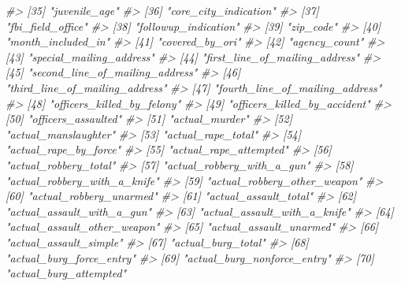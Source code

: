 \documentclass[
]{krantz}
\makeatletter
\newenvironment{Shaded}{\begin{snugshade}}{\end{snugshade}}
\newcommand{\CommentTok}[1]{\textcolor[rgb]{0.37,0.37,0.37}{\textit{#1}}}
\newenvironment{kframe}{%
\medskip{}
\setlength{\fboxsep}{.8em}
 \def\at@end@of@kframe{}%
 \ifinner\ifhmode%
  \def\at@end@of@kframe{\end{minipage}}%
  \begin{minipage}{\columnwidth}%
 \fi\fi%
 \def\FrameCommand##1{\hskip\@totalleftmargin \hskip-\fboxsep
 \colorbox{shadecolor}{##1}\hskip-\fboxsep
     \hskip-\linewidth \hskip-\@totalleftmargin \hskip\columnwidth}%
 \MakeFramed {\advance\hsize-\width
   \@totalleftmargin\z@ \linewidth\hsize
   \@setminipage}}%
 {\par\unskip\endMakeFramed%
 \at@end@of@kframe}
\renewenvironment{Shaded}{\begin{kframe}}{\end{kframe}}
\makeatother
\begin{document}
\begin{Shaded}
\begin{Highlighting}[]
\CommentTok{\#\textgreater{}  [35] "juvenile\_age"                    }
\CommentTok{\#\textgreater{}  [36] "core\_city\_indication"            }
\CommentTok{\#\textgreater{}  [37] "fbi\_field\_office"                }
\CommentTok{\#\textgreater{}  [38] "followup\_indication"             }
\CommentTok{\#\textgreater{}  [39] "zip\_code"                        }
\CommentTok{\#\textgreater{}  [40] "month\_included\_in"               }
\CommentTok{\#\textgreater{}  [41] "covered\_by\_ori"                  }
\CommentTok{\#\textgreater{}  [42] "agency\_count"                    }
\CommentTok{\#\textgreater{}  [43] "special\_mailing\_address"         }
\CommentTok{\#\textgreater{}  [44] "first\_line\_of\_mailing\_address"   }
\CommentTok{\#\textgreater{}  [45] "second\_line\_of\_mailing\_address"  }
\CommentTok{\#\textgreater{}  [46] "third\_line\_of\_mailing\_address"   }
\CommentTok{\#\textgreater{}  [47] "fourth\_line\_of\_mailing\_address"  }
\CommentTok{\#\textgreater{}  [48] "officers\_killed\_by\_felony"       }
\CommentTok{\#\textgreater{}  [49] "officers\_killed\_by\_accident"     }
\CommentTok{\#\textgreater{}  [50] "officers\_assaulted"              }
\CommentTok{\#\textgreater{}  [51] "actual\_murder"                   }
\CommentTok{\#\textgreater{}  [52] "actual\_manslaughter"             }
\CommentTok{\#\textgreater{}  [53] "actual\_rape\_total"               }
\CommentTok{\#\textgreater{}  [54] "actual\_rape\_by\_force"            }
\CommentTok{\#\textgreater{}  [55] "actual\_rape\_attempted"           }
\CommentTok{\#\textgreater{}  [56] "actual\_robbery\_total"            }
\CommentTok{\#\textgreater{}  [57] "actual\_robbery\_with\_a\_gun"       }
\CommentTok{\#\textgreater{}  [58] "actual\_robbery\_with\_a\_knife"     }
\CommentTok{\#\textgreater{}  [59] "actual\_robbery\_other\_weapon"     }
\CommentTok{\#\textgreater{}  [60] "actual\_robbery\_unarmed"          }
\CommentTok{\#\textgreater{}  [61] "actual\_assault\_total"            }
\CommentTok{\#\textgreater{}  [62] "actual\_assault\_with\_a\_gun"       }
\CommentTok{\#\textgreater{}  [63] "actual\_assault\_with\_a\_knife"     }
\CommentTok{\#\textgreater{}  [64] "actual\_assault\_other\_weapon"     }
\CommentTok{\#\textgreater{}  [65] "actual\_assault\_unarmed"          }
\CommentTok{\#\textgreater{}  [66] "actual\_assault\_simple"           }
\CommentTok{\#\textgreater{}  [67] "actual\_burg\_total"               }
\CommentTok{\#\textgreater{}  [68] "actual\_burg\_force\_entry"         }
\CommentTok{\#\textgreater{}  [69] "actual\_burg\_nonforce\_entry"      }
\CommentTok{\#\textgreater{}  [70] "actual\_burg\_attempted"           }

\end{Highlighting}
\end{Shaded}
\end{document}
